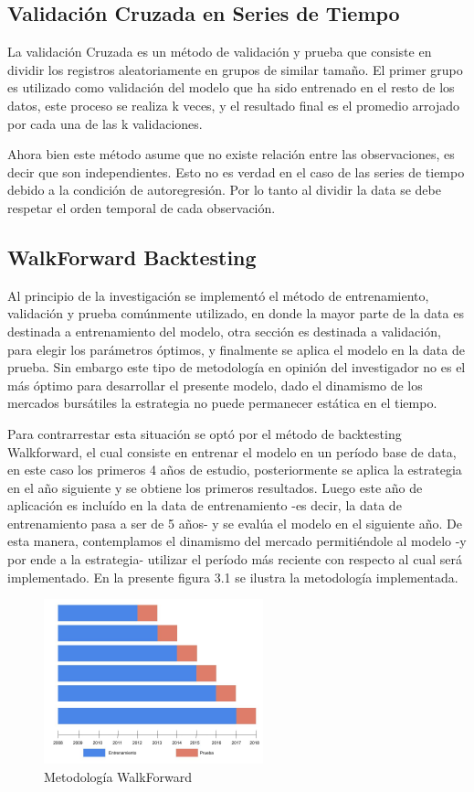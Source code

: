\documentclass[a4paper,12pt]{Latex/Classes/PhDthesisPSnPDF}
\begin{document}
\subsection{Validación Cruzada en Series de Tiempo}

La validación Cruzada es un método de validación y prueba que consiste en dividir los registros aleatoriamente en grupos de similar tamaño. El primer grupo es utilizado como validación del modelo que ha sido entrenado en el resto de los datos, este proceso se realiza k veces, y el resultado final es el promedio arrojado por cada una de las k validaciones.

Ahora bien este método asume que no existe relación entre las observaciones, es decir que son independientes. Esto no es verdad en el caso de las series de tiempo debido a la condición de autoregresión. Por lo tanto al dividir la data se debe respetar el orden temporal de cada observación. 

\subsection{WalkForward Backtesting}

Al principio de la investigación se implementó el método de entrenamiento, validación y prueba comúnmente utilizado, en donde la mayor parte de la data es destinada a entrenamiento del modelo, otra sección es destinada a validación, para elegir los parámetros óptimos, y finalmente se aplica el modelo en la data de prueba. Sin embargo este tipo de metodología en opinión del investigador no es el más óptimo para desarrollar el presente modelo, dado el dinamismo de los mercados bursátiles la estrategia no puede permanecer estática en el tiempo.

Para contrarrestar esta situación se optó por el método de backtesting Walkforward, el cual consiste en entrenar el modelo en un período base de data, en este caso los primeros 4 años de estudio, posteriormente se aplica la estrategia en el año siguiente y se obtiene los primeros resultados. Luego este año de aplicación es incluído en la data de entrenamiento -es decir, la data de entrenamiento pasa a ser de 5 años- y se evalúa el modelo en el siguiente año. De esta manera, contemplamos el dinamismo del mercado permitiéndole al modelo -y por ende a la estrategia- utilizar el período más reciente con respecto al cual será implementado. En la presente figura 3.1 se ilustra la metodología implementada.

\begin{figure}[ht]
\begin{center}
\includegraphics[width=2.5in]{images/walkforward_plot}
\end{center}
\caption{Metodología WalkForward}
\end{figure}
\end{document}
